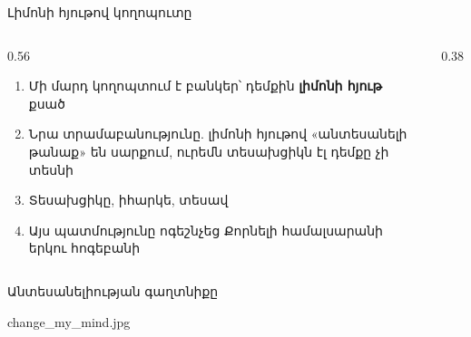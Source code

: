 \begin{frame}{Լիմոնի հյութով կողոպուտը}
  \begin{columns}[c]
    \begin{column}{0.56\textwidth}
      \begin{enumerate}
        \item<1-> Մի մարդ կողոպտում է բանկեր՝ դեմքին \textbf{լիմոնի հյութ} քսած
        \item<2-> Նրա տրամաբանությունը. լիմոնի հյութով «անտեսանելի թանաք» են սարքում, ուրեմն տեսախցիկն էլ դեմքը չի տեսնի
        \item<3-> Տեսախցիկը, իհարկե, տեսավ 
        \item<4-> Այս պատմությունը ոգեշնչեց Քորնելի համալսարանի երկու հոգեբանի
      \end{enumerate}
    \end{column}
    \begin{column}{0.38\textwidth}
      \centering
      \ \raisebox{0.5cm}{\Large$\rightarrow$}\ \ \par\medskip
    \end{column}
  \end{columns}
\end{frame}

\begin{frame}{Անտեսանելիության գաղտնիքը}
  \centering
  \begin{meme}[8.2cm]{change_my_mind.jpg}
  \end{meme}
\end{frame}

